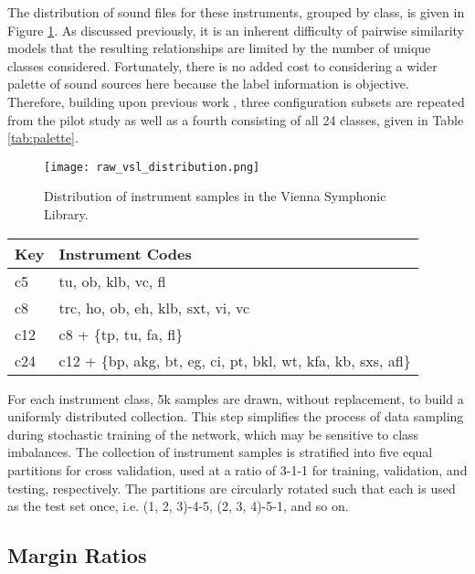 The distribution of sound files for these instruments, grouped by class, is given in Figure \ref{fig:c24_dist}.
As discussed previously, it is an inherent difficulty of pairwise similarity models that the resulting relationships are limited by the number of unique classes considered.
Fortunately, there is no added cost to considering a wider palette of sound sources here because the label information is objective.
Therefore, building upon previous work \cite{Humphrey2011}, three configuration subsets are repeated from the pilot study as well as a fourth consisting of all 24 classes, given in Table \ref{tab:palette}.

\begin{figure}[t]
\centering
\texttt{[image: raw\_vsl\_distribution.png]}
\caption{Distribution of instrument samples in the Vienna Symphonic Library.}
\label{fig:c24_dist}
\end{figure}


\begin{table*}[t]
\begin{center}
\caption{Instrument set configurations.}
\begin{tabular}{l | l }
Key & Instrument Codes \\
\hline
c5 & tu, ob, klb, vc, fl \\
c8 & trc, ho, ob, eh, klb, sxt, vi, vc \\
c12 & c8 + \{tp, tu, fa, fl\} \\
c24 & c12 + \{bp, akg, bt, eg, ci, pt, bkl, wt, kfa, kb, sxs, afl\} \\
\hline
\end{tabular}
\label{tab:palette}
\end{center}
\end{table*}

For each instrument class, 5k samples are drawn, without replacement, to build a uniformly distributed collection.
This step simplifies the process of data sampling during stochastic training of the network, which may be sensitive to class imbalances.
The collection of instrument samples is stratified into five equal partitions for cross validation, used at a ratio of 3-1-1 for training, validation, and testing, respectively.
The partitions are circularly rotated such that each is used as the test set once, i.e. (1, 2, 3)-4-5, (2, 3, 4)-5-1, and so on.


\subsection{Margin Ratios}

